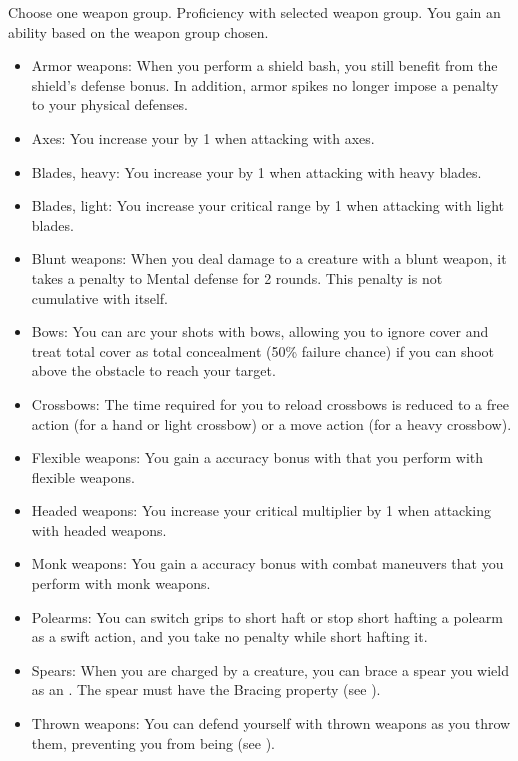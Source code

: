     Choose one weapon group.
    \featpre Proficiency with selected weapon group.
    \featben You gain an ability based on the weapon group chosen.
    \begin{itemize}
        \item Armor weapons: When you perform a shield bash, you still benefit from the shield's defense bonus.
            In addition, armor spikes no longer impose a penalty to your physical defenses.
        \item Axes: You increase your  by 1 when attacking with axes.
        \item Blades, heavy: You increase your  by 1 when attacking with heavy blades.
        \item Blades, light: You increase your critical range by 1 when attacking with light blades.
        \item Blunt weapons: When you deal damage to a creature with a blunt weapon, it takes a  penalty to Mental defense for 2 rounds.
            This penalty is not cumulative with itself.
        \item Bows: You can arc your shots with bows, allowing you to ignore cover and treat total cover as total concealment (50\% failure chance) if you can shoot above the obstacle to reach your target.
        \item Crossbows: The time required for you to reload crossbows is reduced to a free action (for a hand or light crossbow) or a move action (for a heavy crossbow).
        \item Flexible weapons: You gain a  accuracy bonus with  that you perform with flexible weapons.
        \item Headed weapons: You increase your critical multiplier by 1 when attacking with headed weapons.
        \item Monk weapons: You gain a  accuracy bonus with combat maneuvers that you perform with monk weapons.
        \item Polearms: You can switch grips to short haft or stop short hafting a polearm as a swift action, and you take no penalty while short hafting it.
        \item Spears: When you are charged by a creature, you can brace a spear you wield as an . The spear must have the Bracing property (see ).
        \item Thrown weapons: You can defend yourself with thrown weapons as you throw them, preventing you from being  (see ).
    \end{itemize}

